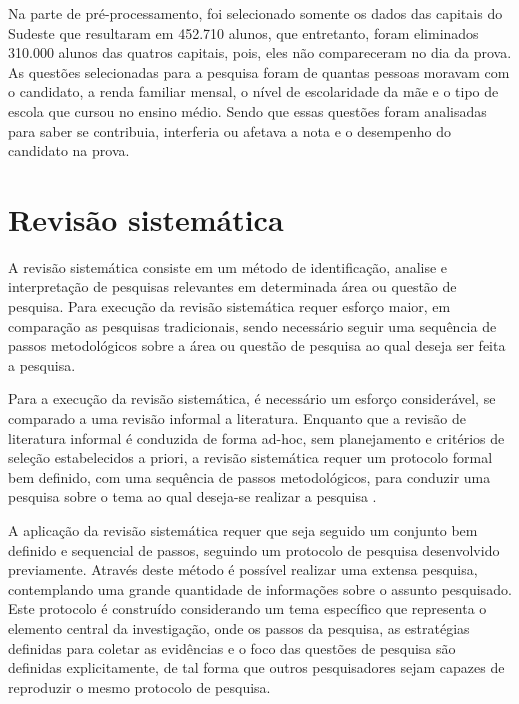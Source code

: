 \par
Na parte de pré-processamento, foi selecionado somente os dados das capitais do Sudeste que resultaram em 452.710 alunos, que entretanto, foram eliminados 310.000 alunos das quatros capitais, pois, eles não compareceram no dia da prova. As questões selecionadas para a pesquisa  foram de quantas pessoas moravam com o candidato, a renda familiar mensal, o nível de escolaridade da mãe e o tipo de escola que cursou no ensino médio. Sendo que essas questões foram analisadas para saber se contribuia, interferia ou afetava a nota e o desempenho do candidato na prova.

\par







\section{Revisão sistemática}
A revisão sistemática consiste em um método de identificação, analise e interpretação de pesquisas relevantes em determinada área ou questão de pesquisa. Para execução da revisão sistemática requer esforço maior, em comparação as pesquisas tradicionais, sendo necessário seguir uma sequência de passos metodológicos sobre a área ou questão de pesquisa ao qual deseja ser feita a pesquisa\cite{kitchenham2004procedures}.

Para a execução da revisão sistemática, é necessário um esforço considerável, se comparado a uma revisão informal a literatura. Enquanto que a revisão de literatura informal é conduzida de forma ad-hoc, sem planejamento e critérios de seleção estabelecidos a priori, a revisão sistemática requer um protocolo formal bem definido, com uma sequência de passos metodológicos, para conduzir uma pesquisa sobre o tema ao qual deseja-se realizar a pesquisa \cite{MafraTravassos}.

A aplicação da revisão sistemática requer que seja seguido um conjunto bem definido e sequencial de passos, seguindo um protocolo de pesquisa desenvolvido previamente. Através deste método é possível realizar uma extensa pesquisa, contemplando uma grande quantidade de informações sobre o assunto pesquisado\cite{MafraTravassos}. Este protocolo é construído considerando um tema específico que representa o elemento central da investigação, onde os passos da pesquisa, as estratégias definidas para coletar as evidências e o foco das questões de pesquisa são definidas explicitamente, de tal forma que outros pesquisadores sejam capazes de reproduzir o mesmo protocolo de pesquisa\cite{biolchini2005systematic}.

